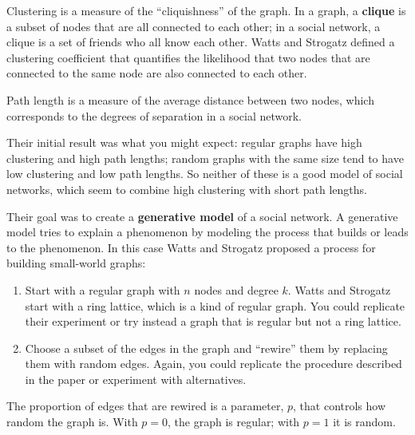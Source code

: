 \documentclass[10pt]{book}
\begin{document}
\begin{description}

\item Clustering is a measure of the ``cliquishness'' of the graph.
In a graph, a {\bf clique} is a subset of nodes that are
all connected to each other; in a social network, a clique is
a set of friends who all know each other.  Watts and Strogatz
defined a clustering coefficient that quantifies the likelihood
that two nodes that are connected to the same node are also
connected to each other.

\item Path length is a measure of the average distance between
two nodes, which corresponds to the degrees of separation in
a social network.

\end{description}

Their initial result was what you might expect: regular graphs
have high clustering and high path lengths;
random graphs with the same size tend to have low clustering
and low path lengths.  So neither of these is a good model of
social networks, which seem to combine high clustering with
short path lengths.

Their goal was to create a {\bf generative model} of a social
network.  A generative model tries to explain a phenomenon by
modeling the process that builds or leads to the phenomenon.  In
this case Watts and Strogatz proposed a process for building
small-world graphs:

\begin{enumerate}

\item Start with a regular graph with $n$ nodes and degree $k$.  
  Watts and Strogatz start with a ring lattice, which is
  a kind of regular graph.  You could replicate their experiment or
  try instead a graph that is regular but not a ring lattice.

\item Choose a subset of the edges in the graph and ``rewire'' them by
  replacing them with random edges.  Again, you could replicate the
  procedure described in the paper or experiment with alternatives.

\end{enumerate}

The proportion of edges that are rewired is a parameter, $p$,
that controls how random the graph is.  With $p=0$, the graph
is regular; with $p=1$ it is random.
\end{document}
